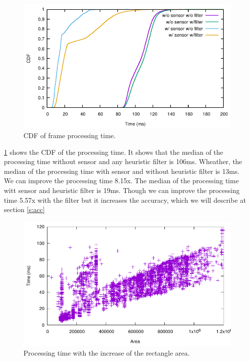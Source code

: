 \begin{figure}[h!]
\centering
\includegraphics[width=5.2in]{plots/walk_cdf_time.pdf}
\caption{CDF of frame processing time.}
\label{f:cdf_time}
\end{figure}

\ref{f:cdf_time} shows the CDF of the processing time.
It shows that the median of the processing time without sensor and any heuristic filter is 106ms.
Wheather, the median of the processing time with sensor and without heuristic filter is 13ms.
We can improve the processing time 8.15x.
The median of the processing time witt sensor and heuristic filter is 19ms.
Though we can improve the processing time 5.57x with the filter but it increases the accuracy, which we will describe at section \ref{s:acc}

\begin{figure}[h!]
\centering
\includegraphics[width=5.2in]{plots/sunny_recarea.pdf}
\caption{Processing time with the increase of the rectangle area.}
\label{f:recarea}
\end{figure}



